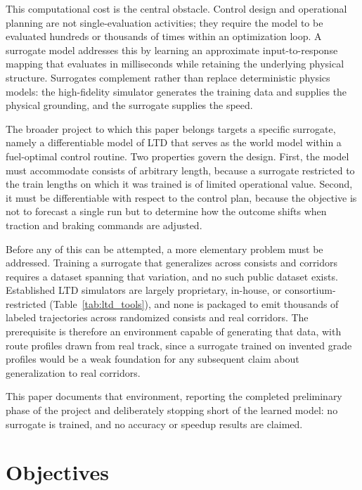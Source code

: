 \documentclass[numbered]{trbunofficial}
\begin{document}
This computational cost is the central obstacle. Control design and operational planning are not single-evaluation activities; they require the model to be evaluated hundreds or thousands of times within an optimization loop. A surrogate model addresses this by learning an approximate input-to-response mapping that evaluates in milliseconds while retaining the underlying physical structure. Surrogates complement rather than replace deterministic physics models: the high-fidelity simulator generates the training data and supplies the physical grounding, and the surrogate supplies the speed.

The broader project to which this paper belongs targets a specific surrogate, namely a differentiable model of LTD that serves as the world model within a fuel-optimal control routine. Two properties govern the design. First, the model must accommodate consists of arbitrary length, because a surrogate restricted to the train lengths on which it was trained is of limited operational value. Second, it must be differentiable with respect to the control plan, because the objective is not to forecast a single run but to determine how the outcome shifts when traction and braking commands are adjusted.

Before any of this can be attempted, a more elementary problem must be addressed. Training a surrogate that generalizes across consists and corridors requires a dataset spanning that variation, and no such public dataset exists. Established LTD simulators are largely proprietary, in-house, or consortium-restricted (Table~\ref{tab:ltd_tools}), and none is packaged to emit thousands of labeled trajectories across randomized consists and real corridors. The prerequisite is therefore an environment capable of generating that data, with route profiles drawn from real track, since a surrogate trained on invented grade profiles would be a weak foundation for any subsequent claim about generalization to real corridors.

This paper documents that environment, reporting the completed preliminary phase of the project and deliberately stopping short of the learned model: no surrogate is trained, and no accuracy or speedup results are claimed.

\section{Objectives}\label{sec:objectives}
\end{document}
